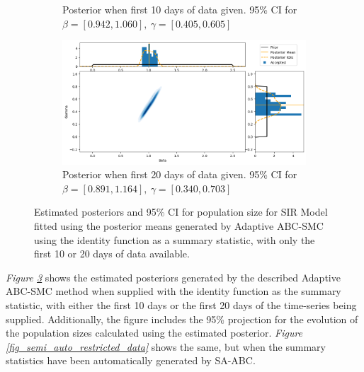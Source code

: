 \documentclass[11pt,a4paper]{article}
\theoremstyle{break}
\begin{document}
\begin{figure}[H]
{\begin{subfigure}{.45\paperwidth}
        \caption{Posterior when first 10 days of data given. 95\% CI for $\beta=[0.942,1.060],\ \gamma=[0.405,0.605]$}
        \label{fig_identity_10_days_posterior}
      \end{subfigure}
      \begin{subfigure}{.45\paperwidth}
        \centering
        \includegraphics[width=1\textwidth]{Identity_ABC_SMC_20_days_joint_posterior.png}
        \caption{Posterior when first 20 days of data given. 95\% CI for $\beta=[0.891,1.164],\ \gamma=[0.340,0.703]$}
        \label{fig_identity_20_days_posterior}
      \end{subfigure}
    }
    \caption{Estimated posteriors and 95\% CI for population size for SIR Model fitted using the posterior means generated by Adaptive ABC-SMC using the identity function as a summary statistic, with only the first 10 or 20 days of data available.}
    \label{fig_identity_restricted_data}
  \end{figure}

  \par \textit{Figure \ref{fig_identity_restricted_data}} shows the estimated posteriors generated by the described Adaptive ABC-SMC method when supplied with the identity function as the summary statistic, with either the first 10 days or the first 20 days of the time-series being supplied. Additionally, the figure includes the 95\% projection for the evolution of the population sizes calculated using the estimated posterior. \textit{Figure \ref{fig_semi_auto_restricted_data}} shows the same, but when the summary statistics have been automatically generated by SA-ABC.
\end{document}
